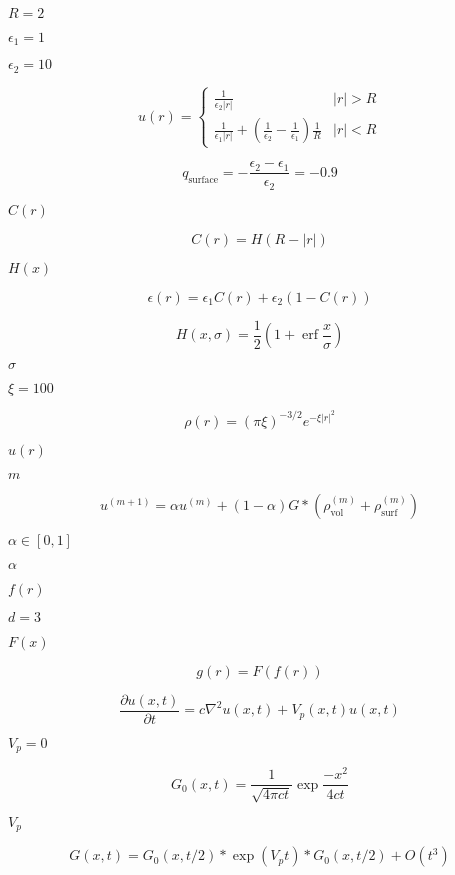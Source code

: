 \documentclass{article}
\begin{document}
$R=2$
\pagebreak

$\epsilon_1 = 1$
\pagebreak

$\epsilon_2 = 10$
\pagebreak

\[
   u(r) =
          \left \lbrace
             \begin{array}{cc}
                  \frac{1}{\epsilon_2 |r|} & |r| > R \\
                  \frac{1}{\epsilon_1 |r|} + \left( \frac{1}{\epsilon_2} - \frac{1}{\epsilon_1} \right) \frac{1}{R}  & |r| < R
             \end{array}
          \right .
\]
\pagebreak

\[
   q_{\mbox{surface}} = -\frac{\epsilon_2 - \epsilon_1}{\epsilon_2} = -0.9
\]
\pagebreak

$C(r)$
\pagebreak

\[
  C(r) = H(R-|r|)
\]
\pagebreak

$H(x)$
\pagebreak

\[
   \epsilon(r) = \epsilon_1 C(r) + \epsilon_2 \left( 1 - C(r) \right)
\]
\pagebreak

\[
   H(x,\sigma) = \frac{1}{2} \left( 1 + \mathop{\mathrm{erf}} \frac{x}{\sigma} \right)
\]
\pagebreak

$\sigma$
\pagebreak

$\xi=100$
\pagebreak

\[
   \rho(r) = \left(\pi \xi \right)^{-3/2} e^{-\xi |r|^2}
\]
\pagebreak

$u(r)$
\pagebreak

$m$
\pagebreak

\[
   u^{(m+1)} = \alpha u^{(m)} + (1-\alpha) G * \left(\rho^{(m)}_{\mbox{vol}} + \rho^{(m)}_{\mbox{surf}} \right)
\]
\pagebreak

$ \alpha \in [0,1]$
\pagebreak

$\alpha$
\pagebreak

$f(r)$
\pagebreak

$d=3$
\pagebreak

$F(x)$
\pagebreak

\[
    g(r) = F(f(r))
\]
\pagebreak

\[
  \frac{\partial u(x,t)}{\partial t} = c \nabla^2 u(x,t) + V_p(x,t) u(x,t)
\]
\pagebreak

$ V_p = 0 $
\pagebreak

\[
  G_0(x,t) = \frac{1}{\sqrt{4 \pi c t}} \exp \frac{-x^2}{4 c t}
\]
\pagebreak

$ V_p $
\pagebreak

\[
  G(x,t) = G_0(x,t/2) * \exp(V_p t) * G_0(x,t/2) + O(t^3)
\]
\pagebreak
\end{document}
